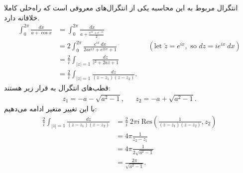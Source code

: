 \label{appendix:activity_calculation}
انتگرال مربوط به این محاسبه یکی از انتگرال‌های معروفی است که راه‌حلی کاملا خلاقانه دارد.
\begin{align*}
	\int_0^{2 \pi
	} \frac{dx}{a + \cos x}  &= \int_0^{2 \pi} \frac{dx}{a + \frac{e^{ix} + e^{-ix}}{2}}  \\
	&= 2\int_0^{2 \pi} \frac{e^{ix} \ dx}{2ae^{ix} + e^{2ix} + 1} && (\text{let } \tilde{z}=e^{ix}, \text{ so } dz = ie^{ix} \ dx) \\
	&= \frac{2}{i} \int_{|z|=1} \frac{dz}{z^2 + 2az + 1} \\
	&= \frac{2}{i} \int_{|z|=1} \frac{dz}{(z-z_1)(z-z_2)}.
\end{align*}
قطب‌های انتگرال به قرار زیر هستند:
\begin{align*} z_1 = -a - \sqrt{a^2-1},  && z_2 = -a + \sqrt{a^2-1}.
\end{align*}
با این تغییر متغیر ادامه می‌دهیم:
\begin{align*}
	\frac{2}{i} \int_{|z|=1} \frac{dz}{(z-z_1)(z-z_2)}
	&= \frac{2}{i} \ 2 \pi i \ \mathrm{Res}\left( \frac{1}{(z-z_1)(z-z_2)}, z_2\right) \\
	&= 4 \pi \frac{1}{z_2 - z_1} \\
	&= 4 \pi \frac{1}{2 \sqrt{a^2 -1}} \\
	&= \frac{2 \pi}{\sqrt{a^2-1}}.
\end{align*}